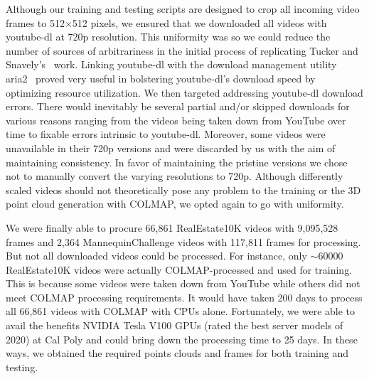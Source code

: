 Although our training and testing scripts are designed to crop all incoming video frames to 512$\times$512 pixels, we ensured that we downloaded all videos with youtube-dl at 720p resolution. This uniformity was so we could reduce the number of sources of arbitrariness in the initial process of replicating Tucker and Snavely's~\cite{single_view_mpi} work. Linking youtube-dl with the download management utility aria2~\cite{noauthor_aria2_2021} proved very useful in bolstering youtube-dl’s download speed by optimizing resource utilization. We then targeted addressing youtube-dl download errors. There would inevitably be several partial and/or skipped downloads for various reasons ranging from the videos being taken down from YouTube over time to fixable errors intrinsic to youtube-dl. Moreover, some videos were unavailable in their 720p versions and were discarded by us with the aim of maintaining consistency. In favor of maintaining the pristine versions we chose not to manually convert the varying resolutions to 720p. Although differently scaled videos should not theoretically pose any problem to the training or the 3D point cloud generation with COLMAP, we opted again to go with uniformity.
    
We were finally able to procure 66,861 RealEstate10K videos with 9,095,528 frames and 2,364 MannequinChallenge videos with 117,811 frames for processing. But not all downloaded videos could be processed. For instance, only $\sim$60000 RealEstate10K videos were actually COLMAP-processed and used for training. This is because some videos were taken down from YouTube while others did not meet COLMAP processing requirements. It would have taken 200 days to process all 66,861 videos with COLMAP with CPUs alone. Fortunately, we were able to avail the benefits NVIDIA Tesla V100 GPUs (rated the best server models of 2020) at Cal Poly and could bring down the processing time to 25 days. In these ways, we obtained the required points clouds and frames for both training and testing.















